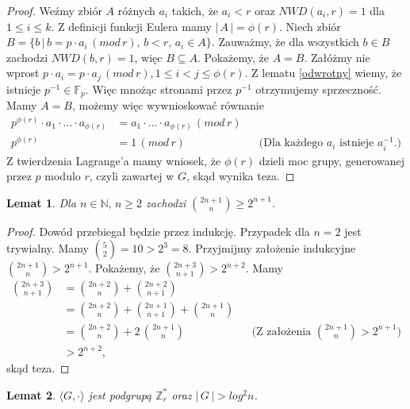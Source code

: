 \documentclass[declaration,shortabstract]{iithesis}
\theoremstyle{definition}
\theoremstyle{remark} \newtheorem{observation}{Obserwacja}
\theoremstyle{plain} \newtheorem{theorem}{Twierdzenie}
\theoremstyle{plain} \newtheorem{lemma}{Lemat}
\theoremstyle{remark} \newtheorem*{remark*}{Uwaga}
\theoremstyle{reminder} \newtheorem*{reminder*}{Przypomnienie}
\begin{document}
\begin{proof}
	Weźmy zbiór $A$ różnych $a_i$ takich, że $a_i < r$ oraz $NWD(a_i, r) = 1$ dla ${1 \leq i \leq k}$. Z definicji funkcji Eulera mamy $| \, A \, | = \phi(r)$. Niech zbiór $B = \{b \, | \, b = p \cdot a_i \, (mod \, r), \, b < r, \, a_i \in A\}$. Zauważmy, że dla wszystkich $b \in B$ zachodzi $NWD(b, r) = 1$, więc $B \subseteq A.$ Pokażemy, że $A = B$. Załóżmy nie wprost $p \cdot a_i = p \cdot a_j \, (mod \, r), 1 \leq i < j \leq \phi(r)$. Z lematu \ref{odwrotny} wiemy, że istnieje $p^{-1} \in \mathbb{F}_p$. Więc mnożąc stronami przez $p^{-1}$ otrzymujemy sprzeczność. \newline
	Mamy $A = B$, możemy więc wywnioskować równanie 
	\begin{align*}
		p^{\phi(r)} \cdot a_1 \cdot \dots \cdot a_{\phi(r)} &= a_1 \cdot \dots \cdot a_{\phi(r)} \, (mod \, r) \\
		p^{\phi(r)} & = 1 \, (mod \, r) &   & \text{(Dla każdego $a_i$ istnieje $a_i^{-1}$.)} 
	\end{align*}
	Z twierdzenia Lagrange'a mamy wniosek, że $\phi(r)$ dzieli moc grupy, generowanej przez $p$ modulo $r$, czyli zawartej w $G$, skąd wynika teza.
\end{proof}

\begin{lemma}\label{newton1}
	Dla $n \in \mathbb{N}, \, n \geq 2$ zachodzi ${2n + 1 \choose n} \geq 2^{n+1}$.
\end{lemma}
	
\begin{proof}
	Dowód przebiegał będzie przez indukcję. Przypadek dla $n = 2$ jest trywialny. Mamy ${5 \choose 2} = 10 > 2^3 = 8.$\newline
	Przyjmijmy założenie indukcyjne ${2n + 1 \choose n} > 2^{n+1}$. Pokażemy, że ${2n + 3 \choose n + 1} > 2^{n+2}$. Mamy
	\begin{align*}
		{2n + 3 \choose n + 1} &= {2n + 2 \choose n} + {2n + 2 \choose n + 1} \\
		&= {2n + 2 \choose n} + {2n + 1 \choose n + 1} + {2n + 1 \choose n} \\
		  & = {2n + 2 \choose n} + 2\, {2n + 1 \choose n} &   & \text{(Z założenia ${2n + 1 \choose n} > 2^{n+1}$)} \\
		&> 2^{n+2},
	\end{align*}
	skąd teza.
\end{proof}

\begin{lemma}\label{el_odwr}
	$\langle G, \cdot \rangle$ jest podgrupą $\mathbb{Z}_r^*$ oraz $|\,G\,| > log^2n$.
\end{lemma}
	
\end{document}
